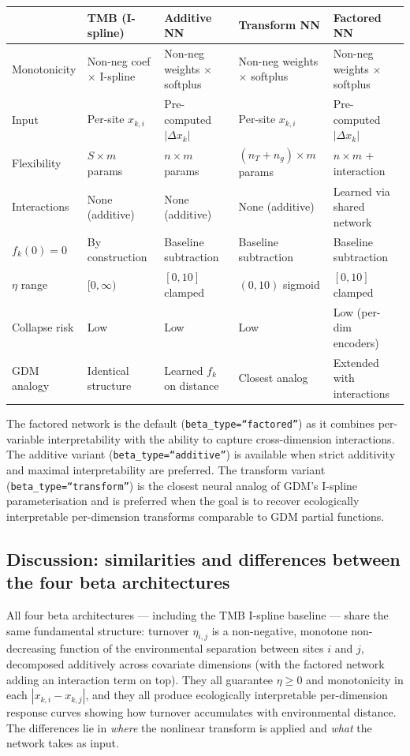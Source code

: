 \documentclass{article}
\begin{document}
\begin{center}
\small
\begin{tabular}{l|l|l|l|l}
    & TMB (I-spline) & Additive NN & Transform NN & Factored NN \\
    \hline
    Monotonicity & Non-neg coef $\times$ I-spline & Non-neg weights $\times$ softplus & Non-neg weights $\times$ softplus & Non-neg weights $\times$ softplus \\
    Input & Per-site $x_{k,i}$ & Pre-computed $|\Delta x_k|$ & Per-site $x_{k,i}$ & Pre-computed $|\Delta x_k|$ \\
    Flexibility & $S \times m$ params & $n \times m$ params & $(n_T + n_g) \times m$ params & $n \times m$ + interaction \\
    Interactions & None (additive) & None (additive) & None (additive) & Learned via shared network \\
    $f_k(0) = 0$ & By construction & Baseline subtraction & Baseline subtraction & Baseline subtraction \\
    $\eta$ range & $[0, \infty)$ & $[0, 10]$ clamped & $(0, 10)$ sigmoid & $[0, 10]$ clamped \\
    Collapse risk & Low & Low & Low & Low (per-dim encoders) \\
    GDM analogy & Identical structure & Learned $f_k$ on distance & Closest analog & Extended with interactions \\
\end{tabular}
\end{center}

The factored network is the default (\texttt{beta\_type=``factored''}) as it combines per-variable interpretability with the ability to capture cross-dimension interactions. The additive variant (\texttt{beta\_type=``additive''}) is available when strict additivity and maximal interpretability are preferred. The transform variant (\texttt{beta\_type=``transform''}) is the closest neural analog of GDM's I-spline parameterisation and is preferred when the goal is to recover ecologically interpretable per-dimension transforms comparable to GDM partial functions.

\subsection{Discussion: similarities and differences between the four beta architectures}
\label{sec:beta-discussion}

All four beta architectures --- including the TMB I-spline baseline --- share the same fundamental structure: turnover $\eta_{i,j}$ is a non-negative, monotone non-decreasing function of the environmental separation between sites $i$ and $j$, decomposed additively across covariate dimensions (with the factored network adding an interaction term on top). They all guarantee $\eta \geq 0$ and monotonicity in each $|x_{k,i} - x_{k,j}|$, and they all produce ecologically interpretable per-dimension response curves showing how turnover accumulates with environmental distance. The differences lie in \emph{where} the nonlinear transform is applied and \emph{what} the network takes as input.
\end{document}

